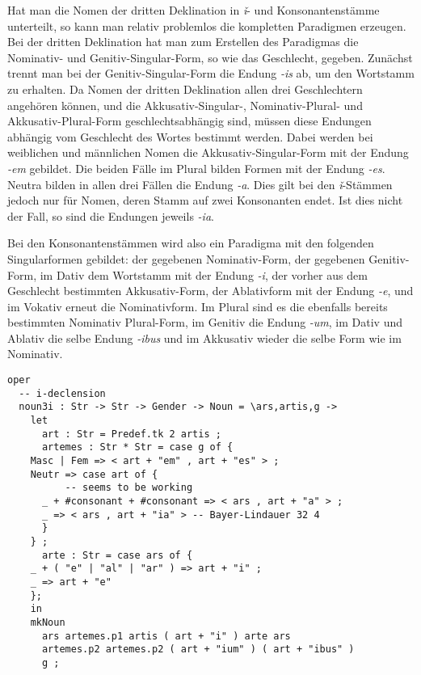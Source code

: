 Hat man die Nomen der dritten Deklination in \textit{ǐ}- und Konsonantenstämme unterteilt, so kann man relativ problemlos die kompletten Paradigmen erzeugen. Bei der dritten Deklination hat man zum Erstellen des Paradigmas die Nominativ- und Genitiv-Singular-Form, so wie das Geschlecht, gegeben. Zunächst trennt man bei der Genitiv-Singular-Form die Endung \textit{-is} ab, um den Wortstamm zu erhalten. Da Nomen der dritten Deklination allen drei Geschlechtern angehören können, und die Akkusativ-Singular-, Nominativ-Plural- und Akkusativ-Plural-Form geschlechtsabhängig sind, müssen diese Endungen abhängig vom Geschlecht des Wortes bestimmt werden. Dabei werden bei weiblichen und männlichen Nomen die Akkusativ-Singular-Form mit der Endung \textit{-em} gebildet. Die beiden Fälle im Plural bilden Formen mit der Endung \textit{-es}. Neutra bilden in allen drei Fällen die Endung \textit{-a}. Dies gilt bei den \textit{ǐ}-Stämmen jedoch nur für Nomen, deren Stamm auf zwei Konsonanten endet. Ist dies nicht der Fall, so sind die Endungen jeweils \textit{-ia}. \par
Bei den Konsonantenstämmen wird also ein Paradigma mit den folgenden Singularformen gebildet: der gegebenen Nominativ-Form, der gegebenen Genitiv-Form, im Dativ dem Wortstamm mit der Endung \textit{-i}, der vorher aus dem Geschlecht bestimmten Akkusativ-Form, der Ablativform mit der Endung \textit{-e}, und im Vokativ erneut die Nominativform. Im Plural sind es die ebenfalls bereits bestimmten Nominativ Plural-Form, im Genitiv die Endung \textit{-um}, im Dativ und Ablativ die selbe Endung \textit{-ibus} und im Akkusativ wieder die selbe Form wie im Nominativ. \par
\begin{lstlisting}[float=h!tp,caption={Die Deklinationsfunktionen für die Nomen der dritten Deklination der \textit{ǐ}-Stämme (vgl. \textbf{MorphoLat.gf})},label={GF-Morpho-Noun3i},basicstyle=\small]
oper
  -- i-declension
  noun3i : Str -> Str -> Gender -> Noun = \ars,artis,g ->
    let 
      art : Str = Predef.tk 2 artis ;
      artemes : Str * Str = case g of {
	Masc | Fem => < art + "em" , art + "es" > ;
	Neutr => case art of {
          -- seems to be working
	  _ + #consonant + #consonant => < ars , art + "a" > ; 
	  _ => < ars , art + "ia" > -- Bayer-Lindauer 32 4
	  }
	} ;
      arte : Str = case ars of {
	_ + ( "e" | "al" | "ar" ) => art + "i" ;
	_ => art + "e"
	};
    in
    mkNoun
      ars artemes.p1 artis ( art + "i" ) arte ars
      artemes.p2 artemes.p2 ( art + "ium" ) ( art + "ibus" ) 
      g ;
\end{lstlisting}
